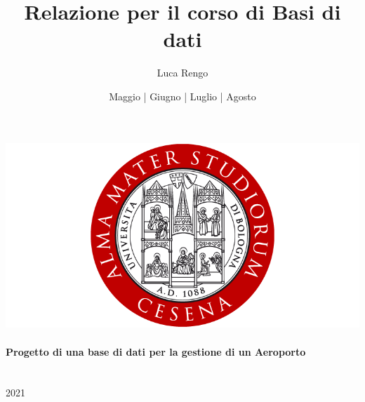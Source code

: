 \documentclass[a4paper, 12pt]{article} %
\begin{document}
	
	\title{Relazione per il corso di Basi di dati}
	\author{Luca Rengo}
	\date{Maggio | Giugno | Luglio | Agosto}
		
	\makeatletter
	\begin{titlepage}
		\begin{center}
			\includegraphics[width=0.7\linewidth]{img/logo/alma_mater_studiorum_cesena_logo.png}\\[4ex]
			{\Huge  \@title }\\[1ex] 
			\textbf{\LARGE Progetto di una base di dati per la gestione di un Aeroporto}\\[2ex] 
			{\large  \@author}\\[2ex] 
			{\large \@date}\\[1ex]
			{\large 2021}
		\end{center}
	\end{titlepage}

	\makeatother
	\thispagestyle{empty}
	
	
	\let\cleardoublepage\clearpage
	\tableofcontents
	\setcounter{page}{2}
	
	
	\fancyhf{}

	
	
	
	
	
	
	
	
	
	
	
	
	
\end{document}
